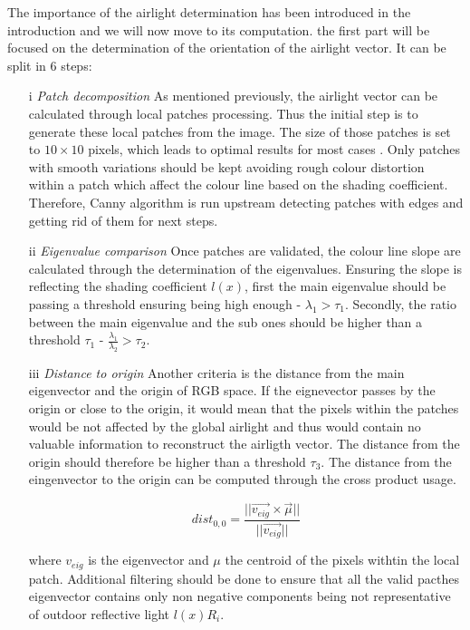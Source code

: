 \documentclass[conference]{IEEEtran}
\begin{document}
The importance of the airlight determination has been introduced in the introduction and we will now move to its computation.
the first part will be focused on the determination of the orientation of the airlight vector. It can be split in 6 steps:
\begin{itemize}[]
\item[i] \textit{Patch decomposition} As mentioned previously, the airlight vector can be calculated through local patches processing. 
Thus the initial step is to generate these local patches from the image. The size of those patches is set to $10 \times 10$ pixels, which leads to optimal results for most cases \cite{airlight}. Only patches with smooth variations
should be kept avoiding rough colour distortion within a patch which affect the colour line based on the shading coefficient.  Therefore, Canny
algorithm is run upstream detecting patches with edges and getting rid of them for next steps.  
\item[ii] \textit{Eigenvalue comparison} Once patches are validated, the colour line slope are calculated through the determination
of the eigenvalues.  Ensuring the slope is reflecting the shading coefficient $l(x)$, first the main eigenvalue should be passing 
a threshold ensuring being high enough - $\lambda_1 > \tau_1$. Secondly, the ratio between the main eigenvalue and the 
sub ones should be higher than a threshold $\tau_1$ - $\frac{\lambda_1}{\lambda_2} > \tau_2$.
\item[iii] \textit{Distance to origin} Another criteria is the distance from the main eigenvector and the origin of RGB space.
If the eignevector passes by the origin or close to the origin, it would mean that the pixels within the patches would be not 
affected by the global airlight and thus would contain no valuable information to reconstruct the airligth vector.  
The distance from the origin should therefore be higher than a threshold $\tau_3$.  The distance from the eingenvector to the origin
can be computed through the cross product usage.

\begin{equation}
\label{Distance to origin}
dist_{0,0} = \frac{||\vec{v_{eig}} \times \vec{\mu}||}{||\vec{v_{eig}}||}
\end{equation}

where $v_{eig}$ is the eigenvector and $\mu$ the centroid of the pixels withtin the local patch.
Additional filtering should be done to ensure that all the valid pacthes eigenvector contains only non negative components being 
not representative of outdoor reflective light $l(x)R_i$.


\end{itemize}
\end{document}
